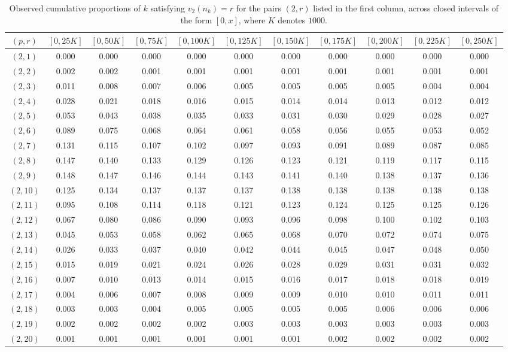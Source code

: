 \documentclass[12pt]{amsart}%
\newcommand{\1}{\mathds{1}}
\theoremstyle{definition}
\numberwithin{equation}{section}
\numberwithin{table}{section}
\numberwithin{figure}{section}
\begin{document}
\begin{table}[htbp]
\centering
\scriptsize
\begin{tabular}{@{}c|cccccccccc@{}}
$(p,r)$ & $[0,25K]$ & $[0,50K]$ & $[0,75K]$ & $[0,100K]$ & $[0,125K]$ & $[0,150K]$ & $[0,175K]$ & $[0,200K]$ & $[0,225K]$ & $[0,250K]$ \\
\hline
$(2,1)$ & 0.000 & 0.000 & 0.000 & 0.000 & 0.000 & 0.000 & 0.000 & 0.000 & 0.000 & 0.000 \\
$(2,2)$ & 0.002 & 0.002 & 0.001 & 0.001 & 0.001 & 0.001 & 0.001 & 0.001 & 0.001 & 0.001 \\
$(2,3)$ & 0.011 & 0.008 & 0.007 & 0.006 & 0.005 & 0.005 & 0.005 & 0.005 & 0.004 & 0.004 \\
$(2,4)$ & 0.028 & 0.021 & 0.018 & 0.016 & 0.015 & 0.014 & 0.014 & 0.013 & 0.012 & 0.012 \\
$(2,5)$ & 0.053 & 0.043 & 0.038 & 0.035 & 0.033 & 0.031 & 0.030 & 0.029 & 0.028 & 0.027 \\
$(2,6)$ & 0.089 & 0.075 & 0.068 & 0.064 & 0.061 & 0.058 & 0.056 & 0.055 & 0.053 & 0.052 \\
$(2,7)$ & 0.131 & 0.115 & 0.107 & 0.102 & 0.097 & 0.093 & 0.091 & 0.089 & 0.087 & 0.085 \\
$(2,8)$ & 0.147 & 0.140 & 0.133 & 0.129 & 0.126 & 0.123 & 0.121 & 0.119 & 0.117 & 0.115 \\
$(2,9)$ & 0.148 & 0.147 & 0.146 & 0.144 & 0.143 & 0.141 & 0.140 & 0.138 & 0.137 & 0.136 \\
$(2,10)$ & 0.125 & 0.134 & 0.137 & 0.137 & 0.137 & 0.138 & 0.138 & 0.138 & 0.138 & 0.138 \\
$(2,11)$ & 0.095 & 0.108 & 0.114 & 0.118 & 0.121 & 0.123 & 0.124 & 0.125 & 0.125 & 0.126 \\
$(2,12)$ & 0.067 & 0.080 & 0.086 & 0.090 & 0.093 & 0.096 & 0.098 & 0.100 & 0.102 & 0.103 \\
$(2,13)$ & 0.045 & 0.053 & 0.058 & 0.062 & 0.065 & 0.068 & 0.070 & 0.072 & 0.074 & 0.075 \\
$(2,14)$ & 0.026 & 0.033 & 0.037 & 0.040 & 0.042 & 0.044 & 0.045 & 0.047 & 0.048 & 0.050 \\
$(2,15)$ & 0.015 & 0.019 & 0.021 & 0.024 & 0.026 & 0.028 & 0.029 & 0.031 & 0.031 & 0.032 \\
$(2,16)$ & 0.007 & 0.010 & 0.013 & 0.014 & 0.015 & 0.016 & 0.017 & 0.018 & 0.018 & 0.019 \\
$(2,17)$ & 0.004 & 0.006 & 0.007 & 0.008 & 0.009 & 0.009 & 0.010 & 0.010 & 0.011 & 0.011 \\
$(2,18)$ & 0.003 & 0.003 & 0.004 & 0.005 & 0.005 & 0.005 & 0.005 & 0.006 & 0.006 & 0.006 \\
$(2,19)$ & 0.002 & 0.002 & 0.002 & 0.002 & 0.003 & 0.003 & 0.003 & 0.003 & 0.003 & 0.003 \\
$(2,20)$ & 0.001 & 0.001 & 0.001 & 0.001 & 0.001 & 0.001 & 0.002 & 0.002 & 0.002 & 0.002 \\
\end{tabular}
\caption{Observed cumulative proportions of $k$ satisfying  $v_2(n_k)=r$ for the pairs $(2,r)$ listed in the first column, across closed intervals of the form $[0,x]$, where $K$ denotes $1000$.}
\label{tab:v2_statistics_cumulative}
\end{table}
\end{document}
